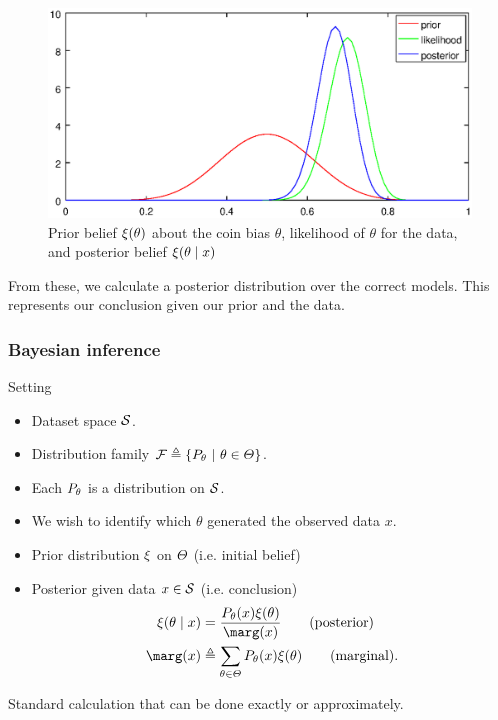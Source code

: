 \begin{frame}
{    \begin{figure}[h]
      \centering
      \includegraphics[width=\textwidth]{beta-posterior}
      \caption{Prior belief $\xi(\theta)$ about the coin bias $\theta$, likelihood of $\theta$ for the data, and posterior belief $\xi(\theta \mid x)$}
    \end{figure}
    From these, we calculate a \alert{posterior} distribution over the correct models. This represents our conclusion given our prior and the data.
  }
\end{frame}



\begin{frame}
  \frametitle{Bayesian inference}
  \begin{block}{Setting}
    \begin{itemize}
    \item Dataset space ${\mathcal{S}}$.
    \item Distribution family $\mathcal{F} \mathrel{\triangleq} \left\{P_\theta ~\middle|~ \theta \in \Theta\right\}$.
    \item Each $P_\theta$ is a distribution on ${\mathcal{S}}$.
    \item We wish to identify which $\theta$ generated the observed data $x$.
    \item Prior distribution $\xi$ on $\Theta$ (i.e. initial belief)
    \item Posterior given data $x \in {\mathcal{S}}$ (i.e. conclusion)
      \begin{align}
        \label{eq:posterior}
        \bel(\param \mid x) &= \frac{P_\param(x) \bel(\param)}{\marg(x)}\tag{posterior}\\
        \marg(x) &\defn \sum_{\param \in \Params} P_\param(x) \bel(\param) \tag{marginal}.
      \end{align}
    \end{itemize}
  \end{block}
  \alert{Standard calculation that can be done exactly or approximately.}
\end{frame}




